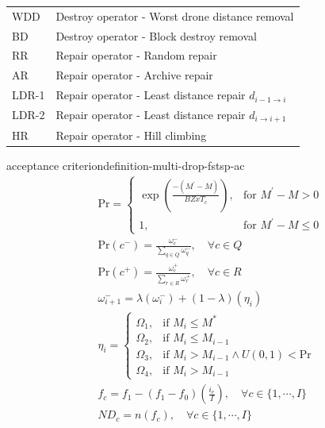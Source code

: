 \begin{table}[!htbp]
\begin{tabularx}{\textwidth}{lX}
        WDD & Destroy operator - Worst drone distance removal\\
        BD & Destroy operator - Block destroy removal\\
        RR & Repair operator - Random repair\\
        AR & Repair operator - Archive repair\\
        LDR-1 & Repair operator - Least distance repair $d_{i - 1 \to i}$\\
        LDR-2 & Repair operator - Least distance repair $d_{i \to i + 1}$\\
        HR & Repair operator - Hill climbing\\
        \bottomrule[1pt]
    \end{tabularx}
\end{table}

\begin{definition}{acceptance criterion}{definition-multi-drop-fstsp-ac}
    \begin{align}
        &\text{Pr} = 
        \begin{cases}
            \exp{\left(\frac{-(M^\prime - M)}{BZxT_c}\right)}, & \text{for } M^\prime - M > 0\\
            1, & \text{for } M^\prime - M \leq 0
        \end{cases} \label{eq:multi-drop-fstsp-ac}\\
        &\text{Pr}(c^-) = \frac{\omega_c^-}{\displaystyle\sum_{q \in Q}\omega_q^-}, \quad \forall c \in Q\\
        &\text{Pr}(c^+) = \frac{\omega_c^+}{\displaystyle\sum_{r \in R}\omega_r^+}, \quad \forall c \in R\\
        &\omega_{i + 1}^- = \lambda(\omega_i^-) + (1 - \lambda)(\eta_i)\\
        &\eta_i = 
        \begin{cases}
            \Omega_1, & \text{if } M_i \leq M^*\\
            \Omega_2, & \text{if } M_i \leq M_{i - 1}\\
            \Omega_3, & \text{if } M_i > M_{i - 1} \wedge U(0,1) < \text{Pr}\\
            \Omega_4, & \text{if } M_i > M_{i - 1}
        \end{cases}\\
        &f_c = f_1 - (f_1 - f_0)\left(\frac{i_c}{I}\right), \quad \forall c \in \{1, \cdots, I\}\label{eq:multi-drop-fstsp-destroy-schedule-1}\\
        &ND_c = n(f_c), \quad \forall c \in \{1,\cdots,I\}\label{eq:multi-drop-fstsp-destroy-schedule-2}\\
    \end{align}
\end{definition}


